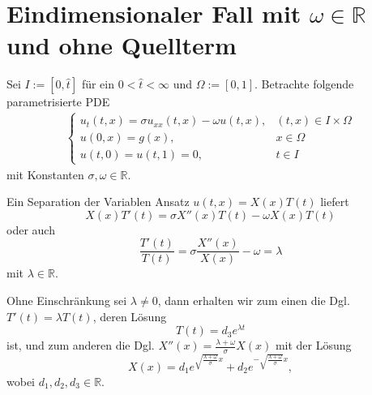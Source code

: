 
\pagestyle{plain}

\section*{Eindimensionaler Fall mit $\omega \in \mathbb{R}$ und ohne Quellterm}

Sei $I := [0, \hat t]$ für ein $0 < \hat t < \infty$ und $\Omega := [0, 1]$.
Betrachte folgende parametrisierte PDE
\begin{align}
    \begin{cases}
    u_{t}(t, x) = \sigma u_{xx}(t, x) - \omega u(t, x), & (t, x) \in I \times \Omega\\
    u(0, x) = g(x), & x \in \Omega \\
    u(t, 0) = u(t, 1) = 0, & t \in I
    \end{cases}
\end{align}
mit Konstanten $\sigma, \omega \in \mathbb{R}$.

Ein Separation der Variablen Ansatz $u(t, x) = X(x) T(t)$ liefert
\begin{equation}
    X(x)T'(t) = \sigma X''(x) T(t) - \omega X(x) T(t)
\end{equation}
oder auch
\begin{equation}
    \frac{T'(t)}{T(t)} = \sigma \frac{X''(x)}{X(x)} - \omega = \lambda
\end{equation}
mit $\lambda \in \mathbb{R}$.

Ohne Einschränkung sei $\lambda \neq 0$, dann erhalten wir zum einen die Dgl.
    $T'(t) = \lambda T(t)$,
deren Lösung
\begin{equation}
    T(t) = d_{3} e^{\lambda t}
\end{equation}
ist, und zum anderen die Dgl.
    $X''(x) =  \frac{\lambda + \omega}{\sigma} X(x)$
mit der Lösung
\begin{equation}
    X(x) = d_{1} e^{\sqrt{\frac{\lambda + \omega}{\sigma}} x} + d_{2} e^{-\sqrt{\frac{\lambda + \omega}{\sigma}}x},
\end{equation}
wobei $d_{1}, d_{2}, d_{3} \in \mathbb{R}$.

